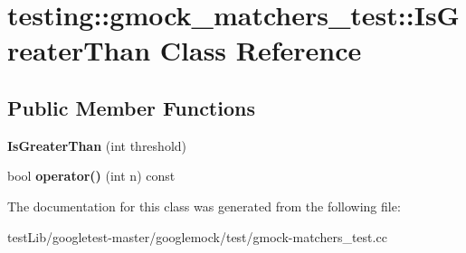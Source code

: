 \hypertarget{classtesting_1_1gmock__matchers__test_1_1IsGreaterThan}{}\section{testing\+:\+:gmock\+\_\+matchers\+\_\+test\+:\+:Is\+Greater\+Than Class Reference}
\label{classtesting_1_1gmock__matchers__test_1_1IsGreaterThan}
\subsection*{Public Member Functions}
\begin{DoxyCompactItemize}
\item 
\mbox{\label{classtesting_1_1gmock__matchers__test_1_1IsGreaterThan_a6682979fb1ed5511995e575954d07aaf}} 
{\bfseries Is\+Greater\+Than} (int threshold)
\item 
\mbox{\label{classtesting_1_1gmock__matchers__test_1_1IsGreaterThan_a34b455148a2d299c654bc4443db0af67}} 
bool {\bfseries operator()} (int n) const
\end{DoxyCompactItemize}


The documentation for this class was generated from the following file\+:\begin{DoxyCompactItemize}
\item 
test\+Lib/googletest-\/master/googlemock/test/gmock-\/matchers\+\_\+test.\+cc\end{DoxyCompactItemize}
